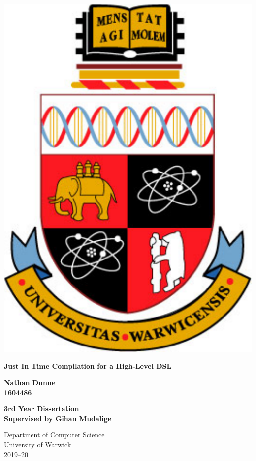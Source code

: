 
\thispagestyle{empty}

\begin{spacing}{2}
	\begin{center}
		\includegraphics[scale = 0.45]{Preamble/WarwickCrest.pdf}
	\end{center}
	\vspace{5mm}
	\begin{center}
		\textbf{\LARGE Just In Time Compilation for a High-Level DSL}
		\vspace{5mm}
	\end{center}
	\begin{center}
		\textbf{\Large Nathan Dunne}\\
		\textbf{\large 1604486}
		\vspace{20mm}
	\end{center}
	\begin{center}
		\textbf{\Large 3rd Year Dissertation}\\
		\textbf{\large Supervised by Gihan Mudalige}\\
		\vspace{20mm}
	\end{center}
	\begin{center}
		{\large Department of Computer Science}\\
		{\large University of Warwick}\\
		{\large 2019--20}
	\end{center}
\end{spacing}

